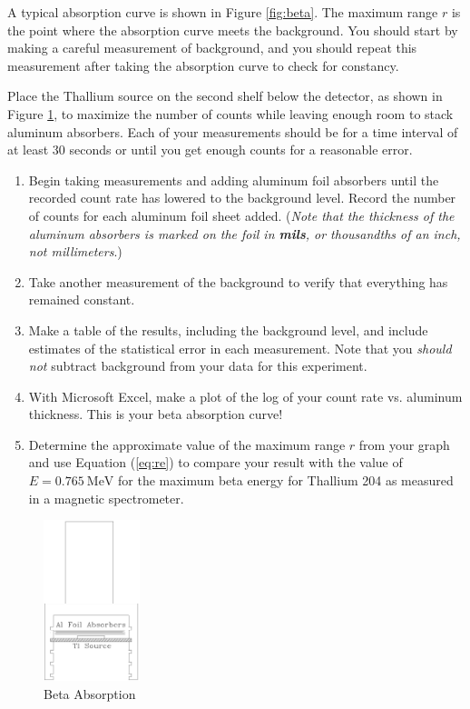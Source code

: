 A typical absorption curve is shown in Figure {\ref{fig:beta}}. The maximum range $r$ is the point where the absorption curve meets the background. You should start by making a careful measurement of background, and you should repeat this measurement after taking the absorption curve to check for constancy.\myskip

Place the Thallium source on the second shelf below the detector, as shown in Figure {\ref{fig:absorption}}, to maximize the number of counts while leaving enough room to stack aluminum absorbers. Each of your measurements should be for a time interval of at least 30 seconds or until you get enough counts for a reasonable error.
\begin{enumerate}
  \item Begin taking measurements and adding aluminum foil absorbers until the recorded count rate has lowered to the background level. Record the number of counts for each aluminum foil sheet added. (\emph{Note that the thickness of the aluminum absorbers is marked on the foil in \textbf{mils}, or thousandths of an inch, not millimeters}.)
  \item Take another measurement of the background to verify that everything has remained constant.
  \item Make a table of the results, including the background level, and include estimates of the statistical error in each measurement. Note that you \emph{should not} subtract background from your data for this experiment.
  \item With Microsoft Excel, make a plot of the log of your count rate vs. aluminum thickness. This is your beta absorption curve!
  \item Determine the approximate value of the maximum range $r$ from your graph and use Equation ({\ref{eq:re}}) to compare your result with the value of $E = 0.765\ \mathrm{MeV}$ for the maximum beta energy for Thallium 204 as measured in a magnetic spectrometer.
\end{enumerate}

\begin{figure}[h]
\centering
\includegraphics[width=0.25\textwidth]{./Exp10/pic/image8.png}
\caption{Beta Absorption}
\label{fig:absorption}
\end{figure}

